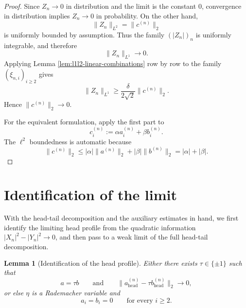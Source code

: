 \documentclass[11pt]{amsart}
\newtheorem{lemma}[theorem]{Lemma}
\begin{document}
\begin{proof}
Since $Z_n \to 0$ in distribution and the limit is the constant $0$,
convergence in distribution implies $Z_n \to 0$ in probability. On the
other hand,
\[
\|Z_n\|_{L^2} = \|c^{(n)}\|_2
\]
is uniformly bounded by assumption. Thus the family $(|Z_n|)_n$ is uniformly
integrable, and therefore
\[
\|Z_n\|_{L^1} \longrightarrow 0.
\]
Applying Lemma \ref{lem:l1l2-linear-combinations} row by row to the family
$(\xi_{n,i})_{i \ge 2}$ gives
\[
\|Z_n\|_{L^1}
\ge
\frac{\delta}{2\sqrt2}\|c^{(n)}\|_2.
\]
Hence $\|c^{(n)}\|_2 \to 0$.

For the equivalent formulation, apply the first part to
\[
c_i^{(n)} := \alpha a_i^{(n)} + \beta b_i^{(n)}.
\]
The $\ell^2$ boundedness is automatic because
\[
\|c^{(n)}\|_2
\le
|\alpha|\|a^{(n)}\|_2 + |\beta|\|b^{(n)}\|_2
=
|\alpha|+|\beta|.
\]
\end{proof}

\section{Identification of the limit}

With the head-tail decomposition and the auxiliary estimates in hand, we first
identify the limiting head profile from the quadratic information
$|X_n|^2-|Y_n|^2 \to 0$, and then pass to a weak limit of the full head-tail
decomposition.

\begin{lemma}[Identification of the head profile]\label{lem:head-sign}
Either there exists $\tau \in \{\pm 1\}$ such that
\[
a = \tau b
\qquad
\text{and}
\qquad
\|a^{(n)}_{\mathrm{head}} - \tau b^{(n)}_{\mathrm{head}}\|_2 \longrightarrow 0,
\]
or else $\eta$ is a Rademacher variable and
\[
a_i=b_i=0
\qquad
\text{for every } i \ge 2.
\]
\end{lemma}
\end{document}
